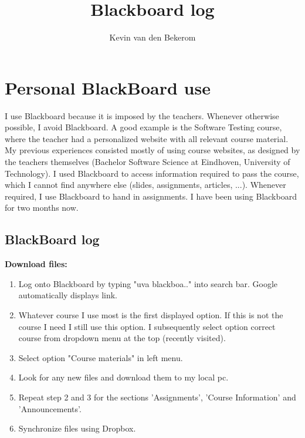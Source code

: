 

\title{Blackboard log}
\what{}
\supervisors{}
\author{Kevin van den Bekerom}




\maketitle



\clearpage

\chapter{Personal BlackBoard use}
I use Blackboard because it is imposed by the teachers. Whenever otherwise possible, I avoid Blackboard. A good example is the Software Testing course, where the teacher had a personalized website with all relevant course material. My previous experiences consisted mostly of using course websites, as designed by the teachers themselves (Bachelor Software Science at Eindhoven, University of Technology). I used Blackboard to access information required to pass the course, which I cannot find anywhere else (slides, assignments, articles, ...). Whenever required, I use Blackboard to hand in assignments. I have been using Blackboard for two months now. 


\section{BlackBoard log}

\textbf{Download files:}
\begin{enumerate}
	\item Log onto Blackboard by typing "uva blackboa.." into search bar. Google automatically displays link.
	\item Whatever course I use most is the first displayed option. If this is not the course I need I still use this option. I subsequently select option correct course from dropdown menu at the top (recently visited).
	\item Select option "Course materials" in left menu.
	\item Look for any new files and download them to my local pc.
	\item Repeat step 2 and 3 for the sections 'Assignments', 'Course Information' and 'Announcements'.
	\item Synchronize files using Dropbox.
\end{enumerate}

